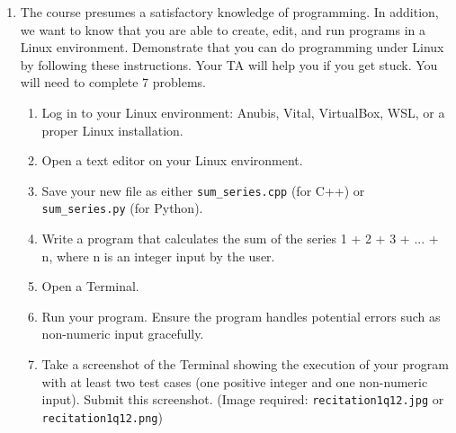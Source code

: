 \documentclass{article}
\begin{document}
\begin{enumerate}
    \item The course presumes a satisfactory knowledge of programming. In addition, we want to know that you are able to create, edit, and run programs in a Linux environment. Demonstrate that you can do programming under Linux by following these instructions. Your TA will help you if you get stuck.  You will need to complete 7 problems.
    \begin{enumerate}
        \item Log in to your Linux environment: Anubis, Vital, VirtualBox, WSL, or a proper Linux installation.
        \item Open a text editor on your Linux environment.
        \item Save your new file as either \texttt{sum_series.cpp} (for C++) or \texttt{sum_series.py} (for Python).
        \item Write a program that calculates the sum of the series 1 + 2 + 3 + ... + n, where n is an integer input by the user.
        \item Open a Terminal.
        \item Run your program.  Ensure the program handles potential errors such as non-numeric input gracefully.
        \item Take a screenshot of the Terminal showing the execution of your program with at least two test cases (one positive integer and one non-numeric input). Submit this screenshot. (Image required: \texttt{recitation1q12.jpg} or \texttt{recitation1q12.png})
    \end{enumerate}
\end{enumerate}
\end{document}
